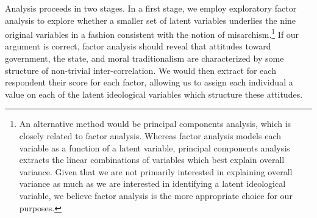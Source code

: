 \documentclass[12pt,]{article}
\begin{document}
Analysis proceeds in two stages. In a first stage, we employ exploratory
factor analysis to explore whether a smaller set of latent variables
underlies the nine original variables in a fashion consistent with the
notion of
misarchism.\footnote{An alternative method would be principal components analysis, which is closely related to factor analysis. Whereas factor analysis models each variable as a function of a latent variable, principal components analysis extracts the linear combinations of variables which best explain overall variance. Given that we are not primarily interested in explaining overall variance as much as we are interested in identifying a latent ideological variable, we believe factor analysis is the more appropriate choice for our purposes.}
If our argument is correct, factor analysis should reveal that attitudes
toward government, the state, and moral traditionalism are characterized
by some structure of non-trivial inter-correlation. We would then
extract for each respondent their score for each factor, allowing us to
assign each individual a value on each of the latent ideological
variables which structure these attitudes.
\end{document}
